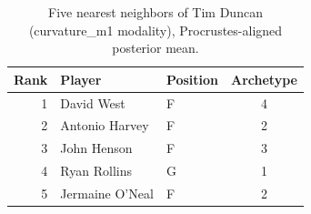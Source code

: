 \begin{table}[htbp]
  \centering\small
  \begin{tabular}{rllc}
    \toprule
    Rank & Player & Position & Archetype \\
    \midrule
    1 & David West & F & 4 \\
    2 & Antonio Harvey & F & 2 \\
    3 & John Henson & F & 3 \\
    4 & Ryan Rollins & G & 1 \\
    5 & Jermaine O'Neal & F & 2 \\
    \bottomrule
  \end{tabular}
  \caption{Five nearest neighbors of Tim Duncan (curvature_m1 modality), Procrustes-aligned posterior mean.}
  \label{tab:Tim_Duncan_neighbors_curvature_m1}
\end{table}

